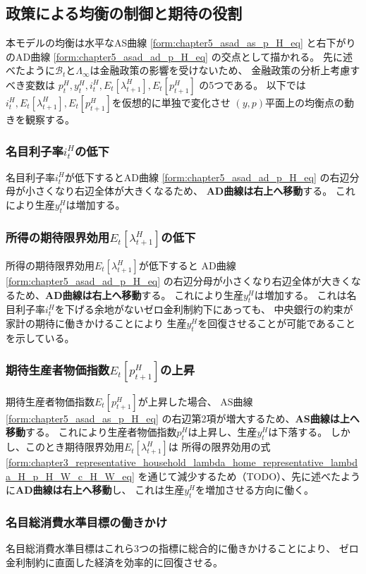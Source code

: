 
\subsection{政策による均衡の制御と期待の役割}
\label{sec:chapter5_asad_monetary_policy}
本モデルの均衡は水平なAS曲線
\eqref{form:chapter5_asad_as_p_H_eq}
と右下がりのAD曲線
\eqref{form:chapter5_asad_ad_p_H_eq}
の交点として描かれる。
先に述べたように\(\mathcal{B}_t\)と\(\Lambda_{\infty}\)は金融政策の影響を受けないため、
金融政策の分析上考慮すべき変数は
\(p_t^H,y_t^H,i_t^H,E_t[\lambda_{t+1}^H],E_t[p_{t+1}^H]\)
の5つである。
以下では\(i_t^H,E_t[\lambda_{t+1}^H],E_t[p_{t+1}^H]\)を仮想的に単独で変化させ
\((y,p)\)平面上の均衡点の動きを観察する。

\subsubsection{名目利子率\(i_t^H\)の低下}
\label{sec:chapter5_asad_monetary_policy_i_H_fall}
名目利子率\(i_t^H\)が低下するとAD曲線
\eqref{form:chapter5_asad_ad_p_H_eq}
の右辺分母が小さくなり右辺全体が大きくなるため、
\textbf{AD曲線は右上へ移動}する。
これにより生産\(y_t^H\)は増加する。

\subsubsection{所得の期待限界効用\(E_t[\lambda_{t+1}^H]\)の低下}
\label{sec:chapter5_asad_monetary_policy_E_lambda_H_fall}
所得の期待限界効用\(E_t[\lambda_{t+1}^H]\)が低下すると
AD曲線
\eqref{form:chapter5_asad_ad_p_H_eq}
の右辺分母が小さくなり右辺全体が大きくなるため、\textbf{AD曲線は右上へ移動}する。
これにより生産\(y_t^H\)は増加する。
これは名目利子率\(i_t^H\)を下げる余地がないゼロ金利制約下にあっても、
中央銀行の約束が家計の期待に働きかけることにより
生産\(y_t^H\)を回復させることが可能であることを示している。

\subsubsection{期待生産者物価指数\(E_t[p_{t+1}^H]\)の上昇}
\label{sec:chapter5_asad_monetary_policy_E_p_H_rise}
期待生産者物価指数\(E_t[p_{t+1}^H]\)が上昇した場合、
AS曲線
\eqref{form:chapter5_asad_as_p_H_eq}
の右辺第2項が増大するため、\textbf{AS曲線は上へ移動}する。
これにより生産者物価指数\(p_t^H\)は上昇し、生産\(y_t^H\)は下落する。
しかし、このとき期待限界効用\(E_t[\lambda_{t+1}^H]\)は
所得の限界効用の式
\eqref{form:chapter3_representative_household_lambda_home_representative_lambda_H_p_H_W_c_H_W_eq}
を通じて減少するため（TODO）、先に述べたように\textbf{AD曲線は右上へ移動}し、
これは生産\(y_t^H\)を増加させる方向に働く。

\subsubsection{名目総消費水準目標の働きかけ}
名目総消費水準目標はこれら3つの指標に総合的に働きかけることにより、
ゼロ金利制約に直面した経済を効率的に回復させる。